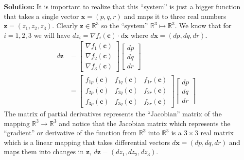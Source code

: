 \documentclass[a4paper, 12pt]{article}
\newenvironment{solution}{ \noindent \textbf{Solution: \medskip}}{}
\begin{document}
\begin{solution}
It is important to realize that this ``system'' is just a bigger function that takes a single vector $\mathbf{x}=(p,q,r)$ and maps it to three real numbers $\mathbf{z}=(z_1,z_2,z_3)$.
Clearly $\mathbf{z}\in \mathbb{R}^3$ so the ``system'' $\mathbb{R}^3 \mapsto \mathbb{R}^3$.
We know that for $i=1,2,3$ we will have $dz_i = \nabla f_i(\mathbf{c})\cdot d\mathbf{x}$ where $d\mathbf{x} = (dp,dq,dr)$.
\begin{align}
	d\mathbf{z} &= \left[\begin{matrix}
		\nabla f_1 (\mathbf{c}) \\
		\nabla f_2 (\mathbf{c}) \\
		\nabla f_3 (\mathbf{c})
	\end{matrix}\right]
	\left[\begin{matrix}
		dp \\
		dq \\
		dr
	\end{matrix}\right] \nonumber \\
	&= \left[\begin{matrix}
		f_{1p}(\mathbf{c}) & f_{1q}(\mathbf{c}) & f_{1r}(\mathbf{c}) \\
		f_{2p}(\mathbf{c}) & f_{2q}(\mathbf{c}) & f_{2r}(\mathbf{c}) \\
		f_{3p}(\mathbf{c}) & f_{3q}(\mathbf{c}) & f_{3r}(\mathbf{c})
	\end{matrix}\right]
	\left[ \begin{matrix}
		dp \\
		dq \\
		dr
	\end{matrix} \right] \nonumber
\end{align}
The matrix of partial derivatives represents the ``Jacobian'' matrix of the mapping $\mathbb{R}^3 \rightarrow \mathbb{R}^3$ and notice that the Jacobian matrix which represents the ``gradient'' or derivative of the function from $\mathbb{R}^3$ into $\mathbb{R}^3$ is a $3\times 3$ real matrix which is a linear mapping that takes differential vectors $d\mathbf{x} = (dp,dq,dr)$ and maps them into changes in $\mathbf{z}$, $d\mathbf{z}=(dz_1,dz_2,dz_3)$.
\end{solution}
\end{document}
